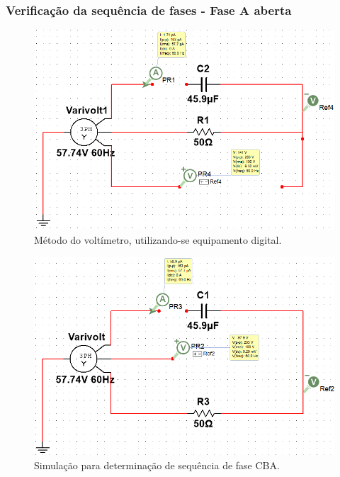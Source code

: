 \documentclass[a4paper,12pt,oneside,openany,table,xcdraw]{article}
\begin{document}
\vspace{1cm}
\subsubsection{Verificação da sequência de fases - Fase A aberta}
\begin{figure}[H]
\centering
\includegraphics[width=13cm]{m2-sim-abc}
\caption{Método do voltímetro, utilizando-se equipamento digital.}
\label{m2:sim:abc}
\end{figure}

\vspace{0.2cm}
\begin{figure}[H]
\centering
\includegraphics[width=13cm]{m2-sim-cba}
\caption{Simulação para determinação de sequência de fase CBA.}
\label{m2:sim:cba}
\end{figure}

\vspace{1cm}
\end{document}
